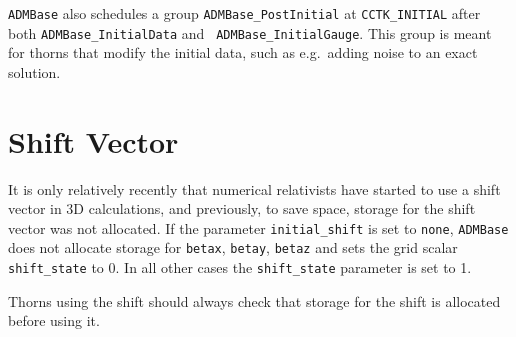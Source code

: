 \documentclass{article}
\begin{document}
{\tt ADMBase} also schedules a group {\tt ADMBase\_PostInitial} at
{\tt CCTK\_INITIAL} after both {\tt ADMBase\_InitialData} and {\tt
  ADMBase\_InitialGauge}.  This group is meant for thorns that modify
the initial data, such as e.g.\ adding noise to an exact solution.



\section{Shift Vector}

It is only relatively recently that numerical relativists have started
to use a shift vector in 3D calculations, and previously, to save
space, storage for the shift vector was not allocated. If the parameter
{\tt initial\_shift} is set to {\tt none}, {\tt ADMBase} does not allocate
storage for {\tt betax}, {\tt betay}, {\tt betaz} and sets the grid scalar
{\tt shift\_state} to 0. In all other cases the {\tt shift\_state} parameter
is set to 1. 

Thorns using the shift should always check that storage for the shift is
allocated before using it.

\end{document}
